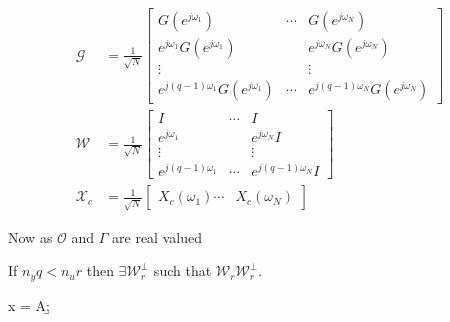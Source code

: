 \documentclass[10pt,a4paper]{scrartcl}
\begin{document}
\begin{multicols*}{2}
\newcommand{\Gejon}[1]{G(e^{j\omega_{#1}})}
\begin{align*}
\mathcal{G}&=\frac{1}{\sqrt{N}}\begin{bmatrix}
\Gejon{1}&\cdots&\Gejon{N}\\
e^{j\omega_1}\Gejon{1}&&e^{j\omega_N}\Gejon{N}\\
\vdots&&\vdots\\
e^{j(q-1)\omega_1}\Gejon{1}&\cdots&e^{j(q-1)\omega_N}\Gejon{N}
\end{bmatrix}\\
\mathcal{W}&=\frac{1}{\sqrt{N}}\begin{bmatrix}
I&\cdots&I\\
e^{j\omega_1}&&e^{j\omega_N}I\\
\vdots&&\vdots\\
e^{j(q-1)\omega_1}&\cdots&e^{j(q-1)\omega_N}I
\end{bmatrix}\\
\mathcal{X}_c&=\frac{1}{\sqrt{N}}\begin{bmatrix}
X_c(\omega_1)\cdots&X_c(\omega_N)
\end{bmatrix}
\end{align*}


Now as $\mathcal{O}$ and $\Gamma$ are real valued


If $n_yq<n_ur$ then $\exists\mathcal{W}_r^\perp$ such that $\mathcal{W}_r\mathcal{W}_r^\perp$.



\begin{TPMatlab}
x = A\b;
\end{TPMatlab}


\end{multicols*}
\end{document}
